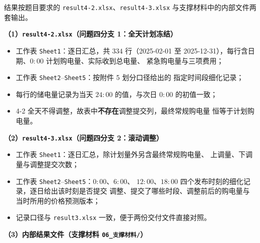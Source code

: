 \documentclass[withoutpreface,bwprint]{cumcmthesis}
\begin{document}
\begin{appendices}
结果按题目要求的 \texttt{result4-2.xlsx}、\texttt{result4-3.xlsx}
与支撑材料中的内部文件两套输出。

\textbf{（1）\texttt{result4-2.xlsx}（问题四分支 1：全天计划冻结）}

\begin{itemize}
  \item 工作表 \texttt{Sheet1}：逐日汇总，共 $334$ 行（2025-02-01 至
        2025-12-31），每行含日期、$0{:}00$ 计划购电量、实际收到总电量、
        紧急购电量与三项费用；
  \item 工作表 \texttt{Sheet2}--\texttt{Sheet5}：按附件 5 划分口径给出的
        指定时间段细化记录；
  \item 每行的储电量记录为当天 $24{:}00$ 的值，与次日 $0{:}00$ 的初值一致；
  \item 4-2 全天不得调整，故表中\textbf{不存在}调整提交列，最终常规购电量
        恒等于计划购电量。
\end{itemize}

\textbf{（2）\texttt{result4-3.xlsx}（问题四分支 2：滚动调整）}

\begin{itemize}
  \item 工作表 \texttt{Sheet1}：逐日汇总，除计划量外另含最终常规购电量、
        上调量、下调量与调整提交次数；
  \item 工作表 \texttt{Sheet2}--\texttt{Sheet5}：$0{:}00$、$6{:}00$、
        $12{:}00$、$18{:}00$ 四个发布时刻的细化记录，逐日给出该时刻是否提交
        调整、提交了哪些时段、调整前后的购电量与当时所用的价格预测版本；
  \item 记录口径与 \texttt{result3.xlsx} 一致，便于两份交付文件直接对照。
\end{itemize}

\textbf{（3）内部结果文件（支撑材料 \texttt{06\_支撑材料/}）}


\end{appendices}
\end{document}
